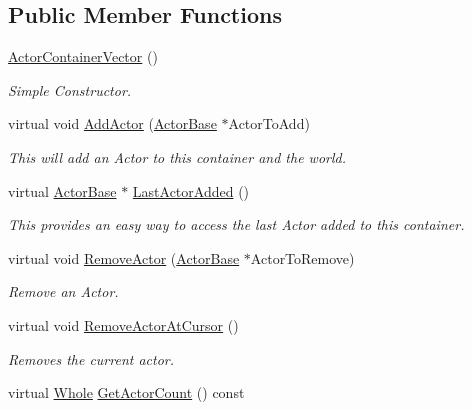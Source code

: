 \subsection*{Public Member Functions}
\begin{DoxyCompactItemize}
\item 
\hyperlink{classphys_1_1ActorContainerVector_aa7e519db8f7247deb934cd98af66ba6b}{ActorContainerVector} ()
\begin{DoxyCompactList}\small\item\em Simple Constructor. \item\end{DoxyCompactList}\item 
virtual void \hyperlink{classphys_1_1ActorContainerVector_a4bc3e38f16caddee021a97739bebaf6e}{AddActor} (\hyperlink{classphys_1_1ActorBase}{ActorBase} $\ast$ActorToAdd)
\begin{DoxyCompactList}\small\item\em This will add an Actor to this container and the world. \item\end{DoxyCompactList}\item 
virtual \hyperlink{classphys_1_1ActorBase}{ActorBase} $\ast$ \hyperlink{classphys_1_1ActorContainerVector_a49e643bdeff78521de9c4a9fea59a0d2}{LastActorAdded} ()
\begin{DoxyCompactList}\small\item\em This provides an easy way to access the last Actor added to this container. \item\end{DoxyCompactList}\item 
virtual void \hyperlink{classphys_1_1ActorContainerVector_aeee5bd81601faed85e6a35f576c8d476}{RemoveActor} (\hyperlink{classphys_1_1ActorBase}{ActorBase} $\ast$ActorToRemove)
\begin{DoxyCompactList}\small\item\em Remove an Actor. \item\end{DoxyCompactList}\item 
virtual void \hyperlink{classphys_1_1ActorContainerVector_a430977daf010a25f53df6cf37954f8ca}{RemoveActorAtCursor} ()
\begin{DoxyCompactList}\small\item\em Removes the current actor. \item\end{DoxyCompactList}\item 
virtual \hyperlink{namespacephys_a460f6bc24c8dd347b05e0366ae34f34a}{Whole} \hyperlink{classphys_1_1ActorContainerVector_a6d2e5e68e23f5798ad10ba41e479d0f7}{GetActorCount} () const 

\end{DoxyCompactItemize}
